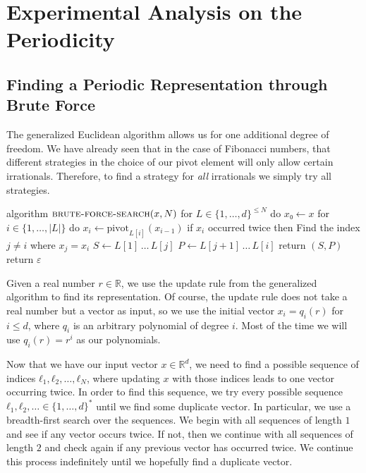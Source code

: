 \chapter{Experimental Analysis on the Periodicity}

\section{Finding a Periodic Representation through Brute Force}

The generalized Euclidean algorithm allows us for one additional degree of
freedom.
We have already seen that in the case of Fibonacci numbers,
that different strategies in the choice of our pivot element will only allow
certain irrationals.
Therefore, to find a strategy for \emph{all} irrationals we simply try all strategies.

\begin{Pseudocode}[float=tbp, label={lst:bfs}, caption={The brute-force search algorithm for finding a periodic representation.}]
algorithm $\textsc{brute-force-search}(x, N)$
  for $L ∈ \{1, …, d\}^{≤ N}$ do
    $x₀ ← x$
    for $i ∈ \{1, …, |L|\}$ do
      $x_i ← \mathrm{pivot}_{L[i]}(x_{i-1})$
      if $x_i$ occurred twice then
        Find the index $j ≠ i$ where $x_j = x_i$
        $S ← L[1] \,…\, L[j]$
        $P ← L[j+1] \,…\, L[i]$
        return $(S, P)$
  return $ε$
\end{Pseudocode}

Given a real number $r ∈ ℝ$, we use the update rule from the generalized
algorithm to find its representation.
Of course, the update rule does not take a real number but a vector as input,
so we use the initial vector $x_i = q_i(r)$ for $i ≤ d$, where $q_i$ is an
arbitrary polynomial of degree $i$.
Most of the time we will use $q_i(r) = r^i$ as our polynomials.

Now that we have our input vector $x ∈ ℝ^d$, we need to find a possible
sequence of indices $ℓ_1, ℓ_2, …, ℓ_N$, where updating $x$ with those
indices leads to one vector occurring twice.
In order to find this sequence, we try every possible sequence
$ℓ_1, ℓ_2, … ∈ \{1, …, d\}^*$ until we find some duplicate vector.
In particular, we use a breadth-first search over the sequences.
We begin with all sequences of length $1$ and see if any vector occurs twice.
If not, then we continue with all sequences of length $2$ and check again if
any previous vector has occurred twice.
We continue this process indefinitely until we hopefully find a duplicate vector.

